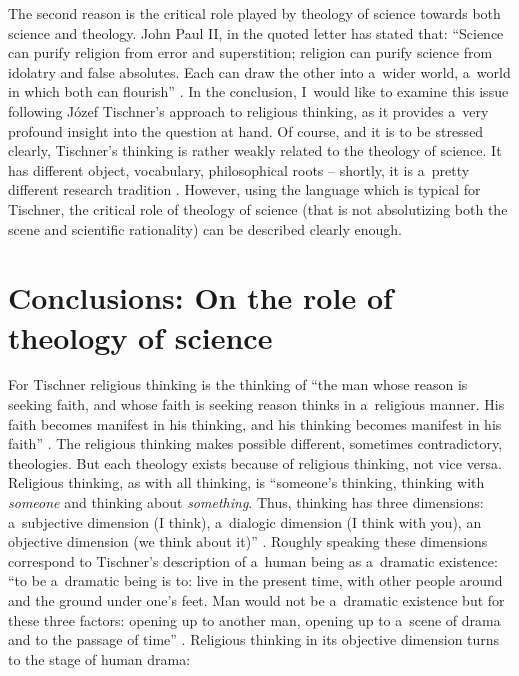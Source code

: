 The second reason is the critical role played by theology of science towards both science and theology. John Paul II, in the quoted letter has stated that: ``Science can purify religion from error and superstition; religion can purify science from idolatry and false absolutes. Each can draw the other into a~wider world, a~world in which both can flourish'' 
\parencite[][]{}. %
 In the conclusion, I~would like to examine this issue following Józef Tischner's approach to religious thinking, as it provides a~very profound insight into the question at hand. Of course, and it is to be stressed clearly, Tischner's thinking is rather weakly related to the theology of science. It has different object, vocabulary, philosophical roots -- shortly, it is a~pretty different research tradition 
\parencite[][]{sierotowicz_filozofia_2018}. %
 However, using the language which is typical for Tischner, the critical role of theology of science (that is not absolutizing both the scene and scientific rationality) can be described clearly enough.



\section{Conclusions: On the role of theology of science}

For Tischner religious thinking is the thinking of ``the man whose reason is seeking faith, and whose faith is seeking reason thinks in a~religious manner. His faith becomes manifest in his thinking, and his thinking becomes manifest in his faith'' 
\parencite[][p.221]{jagiello_jozef_2020}. %
 The religious thinking makes possible different, sometimes contradictory, theologies. But each theology exists because of religious thinking, not vice versa. Religious thinking, as with all thinking, is ``someone's thinking, thinking with \textit{someone} and thinking about \textit{something}. Thus, thinking has three dimensions: a~subjective dimension (I think), a~dialogic dimension (I think with you), an objective dimension (we think about it)'' 
\parencite[][p.224]{jagiello_jozef_2020}. %
 Roughly speaking these dimensions correspond to Tischner's description of a~human being as a~dramatic existence: ``to be a~dramatic being is to: live in the present time, with other people around and the ground under one's feet. Man would not be a~dramatic existence but for these three factors: opening up to another man, opening up to a~scene of drama and to the passage of time'' 
\parencite[][p.165]{jagiello_jozef_2020}. %
 Religious thinking in its objective dimension turns to the stage of human drama:



